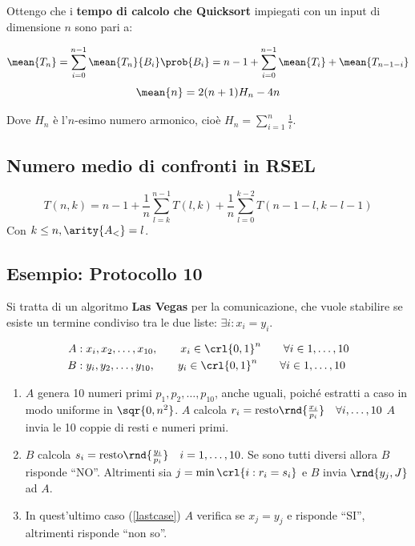 \documentclass[\main/main.tex]{subfiles}
\begin{document}
Ottengo che i \textbf{tempo di calcolo che Quicksort} impiegati con un input di dimensione \(n\) sono pari a:

\[
	\mean{T_n} = \sum_{i = 0}^{n-1} \mean{T_n}{B_i} \prob{B_i} = n-1 + \sum_{i = 0}^{n-1} \mean{T_i} + \mean{T_{n-1-i}}
\]
\[
	\mean{n} = 2(n+1)H_n - 4n
\]

Dove \(H_n\) è l'\(n\)-esimo numero armonico, cioè \(H_n = \sum_{i=1}^n \frac{1}{i}\).

\subsection{Numero medio di confronti in RSEL}
\[
	T(n,k) = n-1 + \frac{1}{n}\sum_{l=k}^{n-1} T(l,k) + \frac{1}{n}\sum_{l=0}^{k-2} T(n-1-l, k-l-1)
\]
Con \(k\leq n, \arity{A_<} = l\).

\subsection{Esempio: Protocollo 10}
Si tratta di un algoritmo \textbf{Las Vegas} per la comunicazione, che vuole stabilire se esiste un termine condiviso tra le due liste: \(\exists i: x_i = y_i\).

\begin{align*}
	A & : x_i, x_2, \ldots, x_{10}, \qquad x_i \in \crl{0,1}^n \qquad \forall i \in 1, \ldots, 10 \\
	B & : y_i, y_2, \ldots, y_{10}, \qquad y_i \in \crl{0,1}^n \qquad \forall i \in 1, \ldots, 10
\end{align*}

\begin{enumerate}
	\item \(A\) genera 10 numeri primi \(p_1, p_2, \ldots, p_10\), anche uguali, poiché estratti a caso in modo uniforme in \(\sqr{0, n^2}\).
	      \subitem \(A\) calcola \(r_i = \text{resto}\rnd{\frac{x_i}{p_i}} \quad \forall i, \ldots, 10\)
	      \subitem \(A\) invia le 10 coppie di resti e numeri primi.
	\item \(B\) calcola \(s_i = \text{resto}\rnd{\frac{y_i}{p_i}} \quad i = 1, \ldots, 10\).
	      \subitem Se sono tutti diversi allora \(B\) risponde ``NO''.
	      \subitem Altrimenti sia \(j=\min\crl{i: r_i = s_i}\) e \(B\) invia \(\rnd{y_j, J}\) ad \(A\). \label{lastcase}
	\item In quest'ultimo caso (\ref{lastcase}) \(A\) verifica se \(x_j = y_j\) e risponde ``SI'', altrimenti risponde ``non so''.
\end{enumerate}
\end{document}
